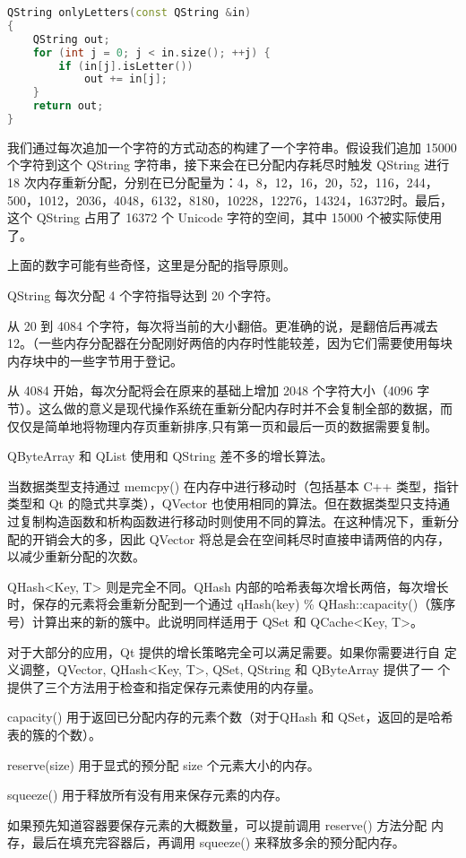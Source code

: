 \begin{lstlisting}[language=C++]
QString onlyLetters(const QString &in)
{
    QString out;
    for (int j = 0; j < in.size(); ++j) {
        if (in[j].isLetter())
            out += in[j];
    }
    return out;
}
\end{lstlisting}

我们通过每次追加一个字符的方式动态的构建了一个字符串。假设我们追加 15000 个字符到这个 QString 字符串，接下来会在已分配内存耗尽时触发 QString 进行 18 次内存重新分配，分别在已分配量为：4，8，12，16，20，52，116，244，500，1012，2036，4048，6132，8180，10228，12276，14324，16372时。最后，这个 QString 占用了 16372 个 Unicode 字符的空间，其中 15000 个被实际使用了。

上面的数字可能有些奇怪，这里是分配的指导原则。

\begin{compactitem}
\item QString 每次分配 4 个字符指导达到 20 个字符。
\item 从 20 到 4084 个字符，每次将当前的大小翻倍。更准确的说，是翻倍后再减去 12。（一些内存分配器在分配刚好两倍的内存时性能较差，因为它们需要使用每块内存块中的一些字节用于登记。
\item 从 4084 开始，每次分配将会在原来的基础上增加 2048 个字符大小（4096 字节）。这么做的意义是现代操作系统在重新分配内存时并不会复制全部的数据，而仅仅是简单地将物理内存页重新排序,只有第一页和最后一页的数据需要复制。
\end{compactitem}

QByteArray 和 QList 使用和 QString 差不多的增长算法。

当数据类型支持通过 memcpy() 在内存中进行移动时（包括基本 C++ 类型，指针类型和 Qt 的隐式共享类），QVector 也使用相同的算法。但在数据类型只支持通过复制构造函数和析构函数进行移动时则使用不同的算法。在这种情况下，重新分配的开销会大的多，因此 QVector 将总是会在空间耗尽时直接申请两倍的内存，以减少重新分配的次数。

QHash<Key, T> 则是完全不同。QHash 内部的哈希表每次增长两倍，每次增长时，保存的元素将会重新分配到一个通过 qHash(key) \% QHash::capacity()（簇序号）计算出来的新的簇中。此说明同样适用于 QSet 和 QCache<Key, T>。

对于大部分的应用，Qt 提供的增长策略完全可以满足需要。如果你需要进行自
定义调整，QVector, QHash<Key, T>, QSet, QString 和 QByteArray 提供了一
个提供了三个方法用于检查和指定保存元素使用的内存量。

\begin{compactitem}
\item capacity() 用于返回已分配内存的元素个数（对于QHash 和 QSet，返回的是哈希表的簇的个数）。
\item reserve(size) 用于显式的预分配 size 个元素大小的内存。
\item squeeze() 用于释放所有没有用来保存元素的内存。
\end{compactitem}

如果预先知道容器要保存元素的大概数量，可以提前调用 reserve() 方法分配
内存，最后在填充完容器后，再调用 squeeze() 来释放多余的预分配内存。


